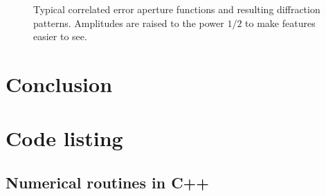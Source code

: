 \documentclass{article}
\begin{document}
\begin{figure}
    \caption{Typical correlated error aperture functions and resulting diffraction patterns. Amplitudes are raised to the power $1/2$ to make features easier to see.}\label{fig:corrpic}
\end{figure}
\restoregeometry{}

\section{Conclusion}\label{sec:conclusion}

\printbibliography{}
\pagebreak

\appendix
\section{Code listing}
\subsection{Numerical routines in C++}






\end{document}

